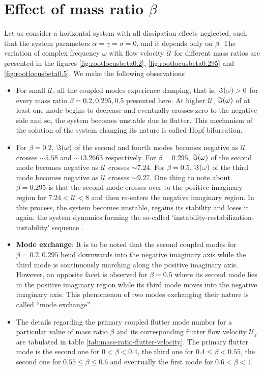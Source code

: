 \documentclass[12pt]{report}
\begin{document}
\section{Effect of mass ratio $\beta$}
Let us consider a horizontal system with all dissipation effects neglected, such that the system parameters $\alpha = \gamma = \sigma = 0$, and it depends only on $\beta$. The variation of complex frequency $\omega$ with flow velocity $\mathcal{U}$ for different mass ratios are presented in the figures \ref{fig:rootlocusbeta0.2}, \ref{fig:rootlocusbeta0.295} and \ref{fig:rootlocusbeta0.5}. We make the following observations

\begin{itemize}
	\item For small $\mathcal{U}$, all the coupled modes experience damping, that is, $\imaginary (\omega) > 0$ for every mass ratio $\beta = 0.2, 0.295, 0.5$ presented here. At higher $\mathcal{U}$, $\imaginary (\omega)$ of at least one mode begins to decrease and eventually crosses zero to the negative side and so, the system becomes unstable due to flutter. This mechanism of the solution of the system changing its nature is called Hopf bifurcation.
	
	\item For $\beta = 0.2$, $\imaginary (\omega)$ of the second and fourth modes becomes negative as $\mathcal{U}$ crosses $\sim 5.58$ and $\sim 13.2663$ respectively. For $\beta = 0.295$, $\imaginary (\omega)$ of the second mode becomes negative as $\mathcal{U}$ crosses $\sim 7.24$. For $\beta = 0.5$, $\imaginary (\omega)$ of the third mode becomes negative as $\mathcal{U}$ crosses $\sim 9.27$. One thing to note about $\beta = 0.295$ is that the second mode crosses over to the positive imaginary region for $7.24 < \mathcal{U} < 8$ and then re-enters the negative imaginary region. In this process, the system becomes unstable, regains its stability and loses it again; the system dynamics forming the so-called `instability-restabilization-instability' sequence \cite{paidoussis}.
	
	\item \textbf{Mode exchange}: It is to be noted that the second coupled modes for $\beta = 0.2, 0.295$ bend downwards into the negative imaginary axis while the third mode is continuously marching along the positive imaginary axis. However, an opposite facet is observed for $\beta = 0.5$ where its second mode lies in the positive imaginary region while its third mode moves into the negative imaginary axis. This phenomenon of two modes exchanging their nature is called ``mode exchange'' \cite{gregory1966} \cite{paidoussis}.
	
	\item The details regarding the primary coupled flutter mode number for a particular value of mass ratio $\beta$ and its corresponding flutter flow velocity $\mathcal{U}_f$ are tabulated in table \ref{tab:mass-ratio-flutter-velocity}. The primary flutter mode is the second one for $0 < \beta < 0.4$, the third one for $0.4 \leq \beta < 0.55$, the second one for $0.55 \leq \beta \leq 0.6$ and eventually the first mode for $0.6 < \beta < 1$.
\end{itemize}
\end{document}
